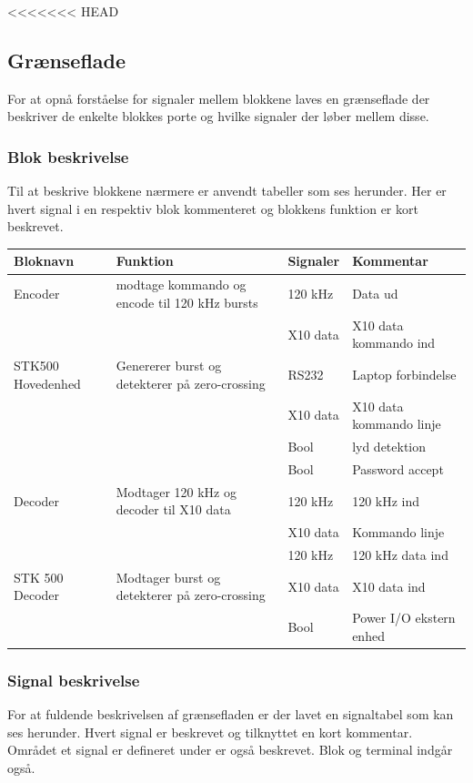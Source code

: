 <<<<<<< HEAD
\clearpage
\newpage

\begin{table}[htbp] %
\subsection{Grænseflade}
For at opnå forståelse for signaler mellem blokkene laves en grænseflade der beskriver de enkelte blokkes porte og hvilke signaler der løber mellem disse.

\subsubsection{Blok beskrivelse}
Til at beskrive blokkene nærmere er anvendt tabeller som ses herunder. Her er hvert signal i en respektiv blok kommenteret og blokkens funktion er kort beskrevet. 

\begin{tabular}{|p{}|p{}|p{}|p{}|}
\hline
\textbf{Bloknavn} & \textbf{Funktion} & \textbf{Signaler} & \textbf{Kommentar} \\ \hline

Encoder & modtage kommando og encode til 120 kHz bursts & 120 kHz & Data ud \\ \cline{3-4}	
& & X10 data & X10 data kommando ind \\ \hline

STK500 Hovedenhed & Genererer burst og detekterer på zero-crossing & RS232 & Laptop forbindelse \\ \cline{3-4}
& & X10 data & X10 data kommando linje \\ \cline{3-4}
& & Bool & lyd detektion \\ \cline{3-4}
& & Bool & Password accept \\ \hline

Decoder & Modtager 120 kHz og decoder til X10 data & 120 kHz & 120 kHz ind \\ \cline{3-4}
& & X10 data & Kommando linje \\ \cline{3-4}
& & 120 kHz & 120 kHz data ind \\ \hline

STK 500 Decoder & Modtager burst og detekterer på zero-crossing & X10 data & X10 data ind \\ \cline{3-4}
&& Bool & Power I/O ekstern enhed \\ \hline 
\end{tabular}

\subsubsection{Signal beskrivelse}
For at fuldende beskrivelsen af grænsefladen er der lavet en signaltabel som kan ses herunder. Hvert signal er beskrevet og tilknyttet en kort kommentar. Området et signal er defineret under er også beskrevet. Blok og terminal indgår også. 


\end{table}
